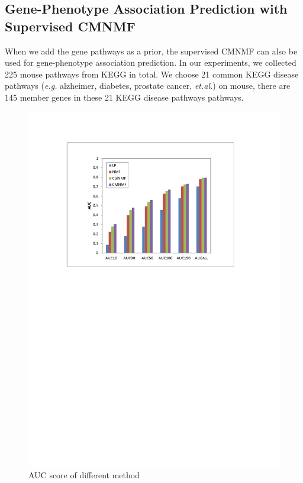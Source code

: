\documentclass{bmcart}
\begin{document}
\subsection*{\textbf{Gene-Phenotype Association Prediction with Supervised CMNMF}}
When we add the gene pathways as a prior, the supervised CMNMF can also be used for gene-phenotype association prediction. In our experiments, we collected 225 mouse pathways from KEGG in total. We choose 21 common KEGG disease pathways (\emph{e.g.} alzheimer, diabetes, prostate cancer, \emph{et.al.}) on mouse, there are 145 member genes in these 21 KEGG disease pathways pathways.
\begin{figure}[!h]
  \begin{minipage}[t]{0.9\linewidth}
    \includegraphics[width=\linewidth,origin = l]{DrawPictures/auc_excel.pdf}
  \end{minipage}
  \caption{AUC score of different method} \label{fig:AUC}
\end{figure}
\end{document}
